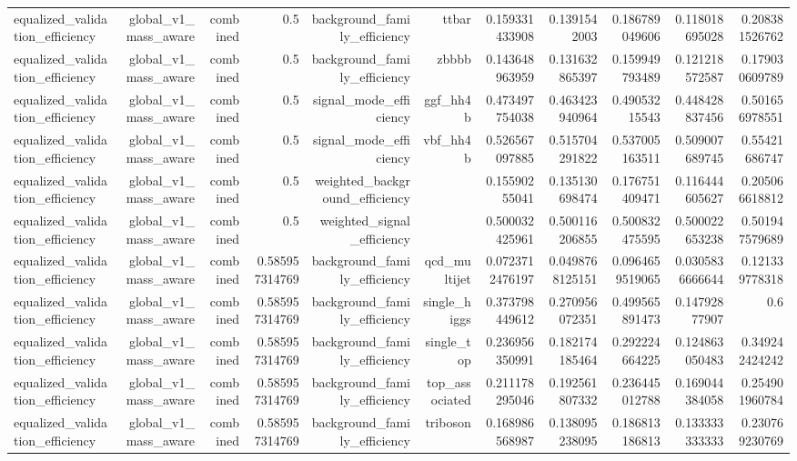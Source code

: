 \begin{table}[htbp]
{\begin{tabular}{lrrrrrrrrrr}
equalized\_validation\_efficiency & global\_v1\_mass\_aware & combined & 0.5 & background\_family\_efficiency & ttbar & 0.159331433908 & 0.1391542003 & 0.186789049606 & 0.118018695028 & 0.208381526762 \\
equalized\_validation\_efficiency & global\_v1\_mass\_aware & combined & 0.5 & background\_family\_efficiency & zbbbb & 0.143648963959 & 0.131632865397 & 0.159949793489 & 0.121218572587 & 0.179030609789 \\
equalized\_validation\_efficiency & global\_v1\_mass\_aware & combined & 0.5 & signal\_mode\_efficiency & ggf\_hh4b & 0.473497754038 & 0.463423940964 & 0.49053215543 & 0.448428837456 & 0.501656978551 \\
equalized\_validation\_efficiency & global\_v1\_mass\_aware & combined & 0.5 & signal\_mode\_efficiency & vbf\_hh4b & 0.526567097885 & 0.515704291822 & 0.537005163511 & 0.509007689745 & 0.55421686747 \\
equalized\_validation\_efficiency & global\_v1\_mass\_aware & combined & 0.5 & weighted\_background\_efficiency &  & 0.15590255041 & 0.135130698474 & 0.176751409471 & 0.116444605627 & 0.205066618812 \\
equalized\_validation\_efficiency & global\_v1\_mass\_aware & combined & 0.5 & weighted\_signal\_efficiency &  & 0.500032425961 & 0.500116206855 & 0.500832475595 & 0.500022653238 & 0.501947579689 \\
equalized\_validation\_efficiency & global\_v1\_mass\_aware & combined & 0.585957314769 & background\_family\_efficiency & qcd\_multijet & 0.0723712476197 & 0.0498768125151 & 0.0964659519065 & 0.0305836666644 & 0.121339778318 \\
equalized\_validation\_efficiency & global\_v1\_mass\_aware & combined & 0.585957314769 & background\_family\_efficiency & single\_higgs & 0.373798449612 & 0.270956072351 & 0.499565891473 & 0.14792877907 & 0.6 \\
equalized\_validation\_efficiency & global\_v1\_mass\_aware & combined & 0.585957314769 & background\_family\_efficiency & single\_top & 0.236956350991 & 0.182174185464 & 0.292224664225 & 0.124863050483 & 0.349242424242 \\
equalized\_validation\_efficiency & global\_v1\_mass\_aware & combined & 0.585957314769 & background\_family\_efficiency & top\_associated & 0.211178295046 & 0.192561807332 & 0.236445012788 & 0.169044384058 & 0.254901960784 \\
equalized\_validation\_efficiency & global\_v1\_mass\_aware & combined & 0.585957314769 & background\_family\_efficiency & triboson & 0.168986568987 & 0.138095238095 & 0.186813186813 & 0.133333333333 & 0.230769230769 \\

\end{tabular}}
\end{table}
